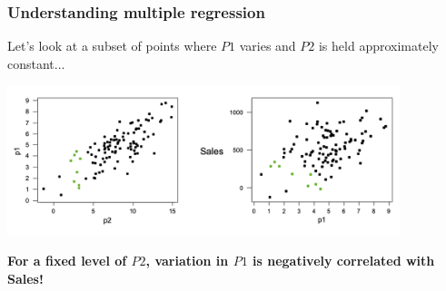 \documentclass{beamer}
\begin{document}
\begin{frame}
\frametitle{Understanding multiple regression}

Let's look at a subset of points where $P1$ varies and $P2$ is held approximately constant...

\vspace{3mm}

\hspace*{-4mm}\includegraphics[width=4.5in]{figures/Sales3.png}

\color{lightblue} {\bf For a fixed level of $P2$, variation in $P1$ is negatively correlated with Sales!}

\end{frame}
\end{document}

